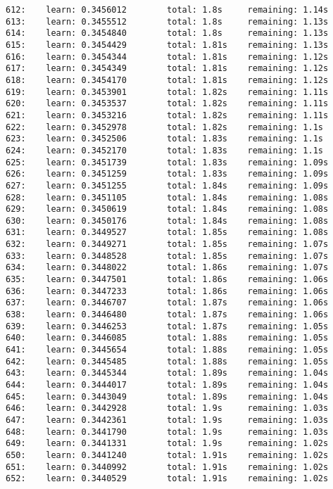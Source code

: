 \documentclass[11pt]{article}
\begin{document}
\begin{Verbatim}[commandchars=\\\{\}]
612:    learn: 0.3456012        total: 1.8s     remaining: 1.14s
613:    learn: 0.3455512        total: 1.8s     remaining: 1.13s
614:    learn: 0.3454840        total: 1.8s     remaining: 1.13s
615:    learn: 0.3454429        total: 1.81s    remaining: 1.13s
616:    learn: 0.3454344        total: 1.81s    remaining: 1.12s
617:    learn: 0.3454349        total: 1.81s    remaining: 1.12s
618:    learn: 0.3454170        total: 1.81s    remaining: 1.12s
619:    learn: 0.3453901        total: 1.82s    remaining: 1.11s
620:    learn: 0.3453537        total: 1.82s    remaining: 1.11s
621:    learn: 0.3453216        total: 1.82s    remaining: 1.11s
622:    learn: 0.3452978        total: 1.82s    remaining: 1.1s
623:    learn: 0.3452506        total: 1.83s    remaining: 1.1s
624:    learn: 0.3452170        total: 1.83s    remaining: 1.1s
625:    learn: 0.3451739        total: 1.83s    remaining: 1.09s
626:    learn: 0.3451259        total: 1.83s    remaining: 1.09s
627:    learn: 0.3451255        total: 1.84s    remaining: 1.09s
628:    learn: 0.3451105        total: 1.84s    remaining: 1.08s
629:    learn: 0.3450619        total: 1.84s    remaining: 1.08s
630:    learn: 0.3450176        total: 1.84s    remaining: 1.08s
631:    learn: 0.3449527        total: 1.85s    remaining: 1.08s
632:    learn: 0.3449271        total: 1.85s    remaining: 1.07s
633:    learn: 0.3448528        total: 1.85s    remaining: 1.07s
634:    learn: 0.3448022        total: 1.86s    remaining: 1.07s
635:    learn: 0.3447501        total: 1.86s    remaining: 1.06s
636:    learn: 0.3447233        total: 1.86s    remaining: 1.06s
637:    learn: 0.3446707        total: 1.87s    remaining: 1.06s
638:    learn: 0.3446480        total: 1.87s    remaining: 1.06s
639:    learn: 0.3446253        total: 1.87s    remaining: 1.05s
640:    learn: 0.3446085        total: 1.88s    remaining: 1.05s
641:    learn: 0.3445654        total: 1.88s    remaining: 1.05s
642:    learn: 0.3445485        total: 1.88s    remaining: 1.05s
643:    learn: 0.3445344        total: 1.89s    remaining: 1.04s
644:    learn: 0.3444017        total: 1.89s    remaining: 1.04s
645:    learn: 0.3443049        total: 1.89s    remaining: 1.04s
646:    learn: 0.3442928        total: 1.9s     remaining: 1.03s
647:    learn: 0.3442361        total: 1.9s     remaining: 1.03s
648:    learn: 0.3441790        total: 1.9s     remaining: 1.03s
649:    learn: 0.3441331        total: 1.9s     remaining: 1.02s
650:    learn: 0.3441240        total: 1.91s    remaining: 1.02s
651:    learn: 0.3440992        total: 1.91s    remaining: 1.02s
652:    learn: 0.3440529        total: 1.91s    remaining: 1.02s

\end{Verbatim}
\end{document}
